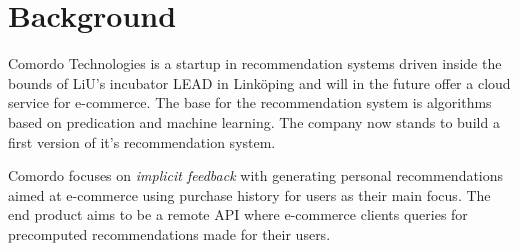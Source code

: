 
\chapter{Background}\label{cha:background}

Comordo Technologies is a startup in recommendation systems driven inside the bounds of LiU's incubator LEAD in Linköping and will in the future offer a cloud service for e-commerce. The base for the recommendation system is algorithms based on predication and machine learning. The company now stands to build a first version of it's recommendation system.

Comordo focuses on \textit{implicit feedback} with generating personal recommendations aimed at e-commerce using purchase history for users as their main focus. The end product aims to be a remote API where e-commerce clients queries for precomputed recommendations made for their users.




\newpage





